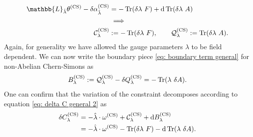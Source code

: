 \documentclass[]{jkpaper}
\theoremstyle{plain}
\theoremstyle{definition}
\newcommand{\sd}{\mathrm {d}}
\def\extd{\mathrm {d}}
\newcommand{\fd}{\delta}
\newcommand{\fL}{\mathbb{L}}
\begin{document}
\begin{equation}\begin{split}
    \fL_{\hat{\lambda}}\theta^{(\text{CS})}-\delta\alpha^{(\text{CS})}_{\hat{\lambda}}
    &=-\Tr(\fd\lambda~ F)+\sd\Tr(\fd\lambda~ A)\\
    &\implies\\
    \mathcal{C}^{(\text{CS})}_{\lambda}&:=-\Tr(\delta\lambda~ F),
    \qquad
    \mathcal{Q}^{(\text{CS})}_{\lambda}:=\Tr(\delta\lambda~ A).
\end{split}\end{equation}
Again, for generality we have allowed the gauge parameters $\lambda$ to be field dependent.  We can now write the boundary piece \eqref{eq: boundary term general} for non-Abelian Chern-Simons as
\begin{equation}\label{eq: boundary term, CS}
    B^{(\text{CS})}_\lambda:=\mathcal{Q}^{(\text{CS})}_\lambda-\fd Q^{(\text{CS})}_\lambda
    =-\Tr(\lambda~ \fd A).
\end{equation}
One can confirm that the variation of the constraint decomposes according to equation \eqref{eq: delta C general 2} as
\begin{equation}\begin{split}\label{eq: delta C CS}
    \delta C^{(\text{CS})}_{\lambda }
    &=-\hat{\lambda}\cdot \omega^{(\text{CS})} + \mathcal{C}^{(\text{CS})}_{\lambda}+\extd B^{(\text{CS})}_\lambda\\
    &=-\hat{\lambda}\cdot \omega^{(\text{CS})} - \Tr(\delta\lambda~ F)-\sd\Tr(\lambda~ \fd A).
\end{split}\end{equation}
\end{document}

